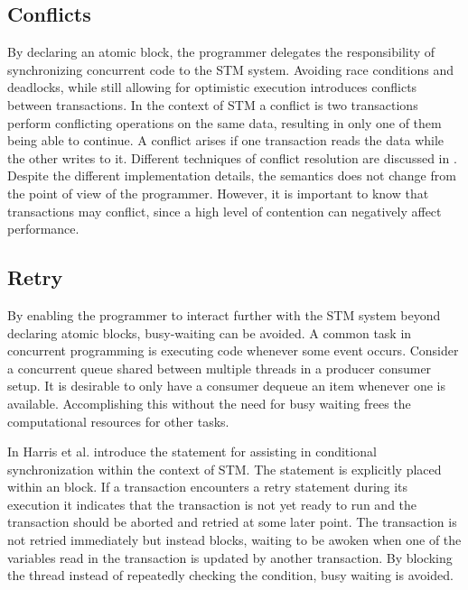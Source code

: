 \subsection{Conflicts}
By declaring an atomic block, the programmer delegates the responsibility of synchronizing concurrent code to the \ac{STM} system. Avoiding race conditions and deadlocks, while still allowing for optimistic execution introduces conflicts between transactions. In the context of \ac{STM} a conflict is two transactions perform conflicting operations on the same data, resulting in only one of them being able to continue\cite[p. 20]{harris2010transactional}. A conflict arises if one transaction reads the data while the other writes to it. Different techniques of conflict resolution are discussed in \cite[p. 45-46 \& 52-55]{dpt907e14trending}. Despite the different implementation details, the semantics does not change from the point of  view of the programmer. However, it is important to know that transactions may conflict, since a high level of contention can negatively affect performance\cite[p. 52]{dpt907e14trending}.

\subsection{Retry}
By enabling the programmer to interact further with the \ac{STM} system beyond declaring atomic blocks, busy-waiting can be avoided. A common task in concurrent programming is executing code whenever some event occurs. Consider a concurrent queue shared between multiple threads in a producer consumer setup. It is desirable to only have a consumer dequeue an item whenever one is available. Accomplishing this without the need for busy waiting frees the computational resources for other tasks.

In \cite{harris2005composable} Harris et al. introduce the  statement for assisting in conditional synchronization within the context of \ac{STM}. The  statement is explicitly placed within an  block. If a transaction encounters a retry statement during its execution it indicates that the transaction is not yet ready to run and the transaction should be aborted and retried at some later point\cite[p. 73]{harris2010transactional}. The transaction is not retried immediately but instead blocks, waiting to be awoken when one of the variables read in the transaction is updated by another transaction\cite[p. 51]{harris2005composable}. By blocking the thread instead of repeatedly checking the condition, busy waiting is avoided.

